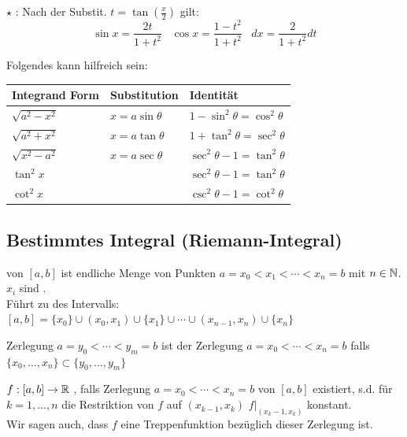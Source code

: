\Satz $\star$ : Nach der Substit. $t = \tan(\frac{x}{2})$ gilt:
$$\sin x = \frac{2t}{1 + t^2} \hspace{10pt} \cos x = \frac{1 - t^2}{1 + t^2} \hspace{10pt} dx = \frac{2}{1 + t^2} dt$$

\begin{minipage}{\linewidth}
\Satz Folgendes kann hilfreich sein:

\begin{tabular}{l l l}
    Integrand Form & Substitution & Identität \\
    \hline
    $\sqrt{a^2 - x^2}$ & $x = a \sin \theta$ & $1 - \sin^2 \theta = \cos^2 \theta$ \\
    $\sqrt{a^2 + x^2}$ & $x = a \tan \theta$ & $1 + \tan^2 \theta = \sec^2 \theta$ \\
    $\sqrt{x^2 - a^2}$ & $x = a \sec \theta$ & $\sec^2 \theta - 1 = \tan^2 \theta$ \\
    $\tan^2 x$         &                     & $\sec^2 \theta - 1 = \tan^2 \theta$ \\
    $\cot^2 x$         &                     & $\csc^2 \theta - 1 = \cot^2 \theta$
\end{tabular}
\end{minipage}

\subsection{Bestimmtes Integral (Riemann-Integral)}

\Def {} von $[a, b]$ ist endliche Menge von Punkten
$a = x_0 < x_1 < \cdots < x_n = b$ mit $n \in \mathbb{N}$. $x_i$ sind . \\
Führt zu  des Intervalls:
$[a, b] = \{x_0\} \cup (x_0, x_1) \cup \{x_1\} \cup \cdots \cup (x_{n-1}, x_n) \cup \{x_n\}$

\Def Zerlegung $a = y_0 < \cdots < y_m = b$ ist  der Zerlegung
$a = x_0 < \cdots < x_n = b$ falls $\{x_0, \ldots, x_n\} \subset \{y_0, \ldots, y_m\}$

\Def $f: [a, b] \to \mathbb{R}$ , falls Zerlegung $a = x_0 < \cdots < x_n = b$
von $[a, b]$ existiert, s.d. für $k = 1, \ldots, n$ die Restriktion von $f$ auf $(x_{k-1}, x_k)$
$f\Big|_{(x_k-1, x_k)}$ konstant. \\
Wir sagen auch, dass $f$ eine Treppenfunktion bezüglich dieser Zerlegung ist.

